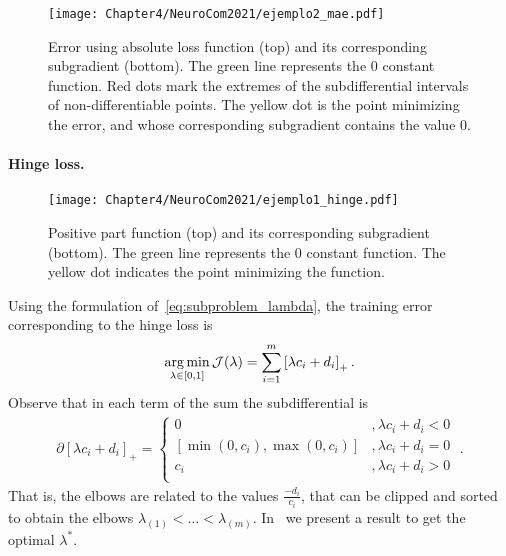 \begin{figure}[t!]
    \centering
    \texttt{[image: Chapter4/NeuroCom2021/ejemplo2\_mae.pdf]}
    \caption{Error using absolute loss function (top) and its corresponding subgradient (bottom). The green line represents the $0$ constant function. Red dots mark the extremes of the subdifferential intervals of non-differentiable points. The yellow dot is the point minimizing the error, and whose corresponding subgradient contains the value $0$.}
    \label{fig:abs_error}
\end{figure}

\paragraph*{Hinge loss.\\}
\begin{figure}[t!]
    \centering
    \texttt{[image: Chapter4/NeuroCom2021/ejemplo1\_hinge.pdf]}
    \caption{Positive part function (top) and its corresponding subgradient (bottom). The green line represents the $0$ constant function. The yellow dot indicates the point minimizing the function.}
    \label{fig:hinge_loss}
\end{figure}
Using the formulation of~\eqref{eq:subproblem_lambda}, the training error corresponding to the hinge loss is
\begin{equation}
    \label{eq:opt_hinge_l1}
    \argmin_{\lambda \in [0, 1]} \mathcal{J}(\lambda) = \sum_{i=1}^{\npertask} \pospart{\lambda c_i + d_i}.
\end{equation}
Observe that in each term of the sum the subdifferential is 
\begin{align*}
    \partial \left[\lambda c_i + d_i \right]_+ = 
    \begin{cases}
        0 &, \lambda c_i + d_i  < 0 \\
        [\min(0, c_i), \max(0, c_i)] &, \lambda c_i + d_i  = 0 \\
        c_i &, \lambda c_i + d_i  > 0 \\
    \end{cases} \; .
\end{align*}
That is, the elbows are related to the values $\frac{-d_i}{c_i}$, that can be clipped and sorted to obtain the elbows ${\lambda}_{(1)} < \ldots < {\lambda}_{(m)}$.
In~\citet[Proposition 2]{RuizAD21} we present a result to get the optimal $\lambda^*$.
